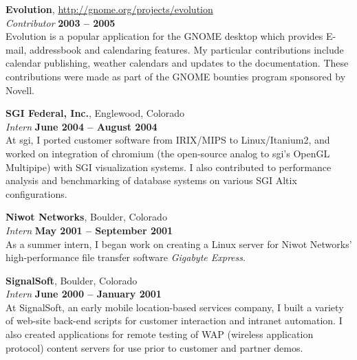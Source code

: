 \documentclass[margin,line]{resume}
\begin{document}
\begin{resume}
        \newpage

        {\bf Evolution}, \href{http://gnome.org/projects/evolution}{http://gnome.org/projects/evolution} \vspace{2mm}\\\vspace{1mm}%
        {\sl Contributor} \hfill {\bf 2003 -- 2005}\\
        Evolution is a popular application for the GNOME desktop which provides
        E-mail, addressbook and calendaring features. My particular contributions
        include calendar publishing, weather calendars and updates to the
        documentation. These contributions were made as part of the GNOME bounties
        program sponsored by Novell.

        {\bf SGI Federal, Inc.}, Englewood, Colorado \vspace{2mm}\\\vspace{1mm}%
        {\sl Intern} \hfill {\bf June 2004 -- August 2004}\\
        At sgi, I ported customer software from IRIX/MIPS to Linux/Itanium2, and
        worked on integration of chromium (the open-source analog to sgi's OpenGL
        Multipipe) with SGI visualization systems. I also contributed to
        performance analysis and benchmarking of database systems on various SGI
        Altix configurations.

        {\bf Niwot Networks}, Boulder, Colorado \vspace{2mm}\\\vspace{1mm}%
        {\sl Intern} \hfill {\bf May 2001 -- September 2001}\\
        As a summer intern, I began work on creating a Linux server for Niwot
        Networks' high-performance file transfer software {\sl Gigabyte Express}.

        {\bf SignalSoft}, Boulder, Colorado \vspace{2mm}\\\vspace{1mm}%
        {\sl Intern} \hfill {\bf June 2000 -- January 2001}\\
        At SignalSoft, an early mobile location-based services company, I built a
        variety of web-site back-end scripts for customer interaction and intranet
        automation. I also created applications for remote testing of WAP
        (wireless application protocol) content servers for use prior to customer
        and partner demos.
    \fi


\end{resume}
\end{document}
